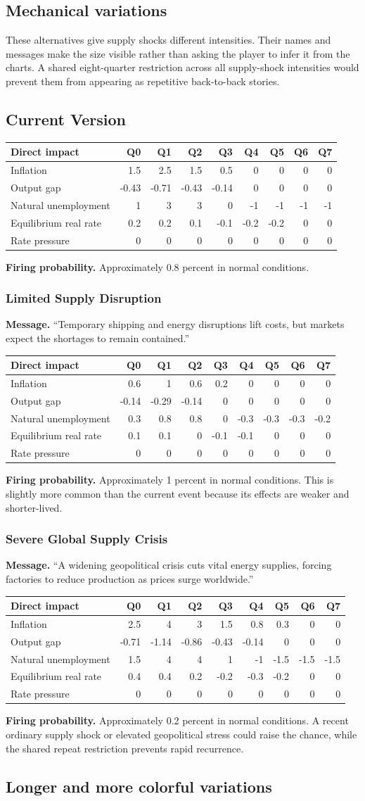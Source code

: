 \documentclass[11pt]{article}
\makeatletter
\newcommand{\prob}{\textbf{Firing probability.} }
\newcommand{\eventmessage}{\textbf{Message.} }
\newcommand{\impacttable}[5]{%
\begin{center}\small
\begin{tabular}{@{}l*{8}{r}@{}}
\toprule
Direct impact & Q0 & Q1 & Q2 & Q3 & Q4 & Q5 & Q6 & Q7\\
\midrule
Inflation & #1\\
Output gap & #2\\
Natural unemployment & #3\\
Equilibrium real rate & #4\\
Rate pressure & #5\\
\bottomrule
\end{tabular}
\end{center}}
\makeatother
\begin{document}
\subsection{Mechanical variations}

These alternatives give supply shocks different intensities.  Their names and
messages make the size visible rather than asking the player to infer it from the
charts.  A shared eight-quarter restriction across all supply-shock intensities
would prevent them from appearing as repetitive back-to-back stories.

\subsection{Current Version}

\impacttable{1.5&2.5&1.5&0.5&0&0&0&0}{-0.43&-0.71&-0.43&-0.14&0&0&0&0}{1&3&3&0&-1&-1&-1&-1}{0.2&0.2&0.1&-0.1&-0.2&-0.2&0&0}{0&0&0&0&0&0&0&0}
\prob Approximately 0.8 percent in normal conditions.

\subsubsection{Limited Supply Disruption}
\eventmessage ``Temporary shipping and energy disruptions lift costs, but markets expect the shortages to remain contained.''
\impacttable{0.6&1&0.6&0.2&0&0&0&0}{-0.14&-0.29&-0.14&0&0&0&0&0}{0.3&0.8&0.8&0&-0.3&-0.3&-0.3&-0.2}{0.1&0.1&0&-0.1&-0.1&0&0&0}{0&0&0&0&0&0&0&0}
\prob Approximately 1 percent in normal conditions.  This is slightly more common than the current event because its effects are weaker and shorter-lived.

\subsubsection{Severe Global Supply Crisis}
\eventmessage ``A widening geopolitical crisis cuts vital energy supplies, forcing factories to reduce production as prices surge worldwide.''
\impacttable{2.5&4&3&1.5&0.8&0.3&0&0}{-0.71&-1.14&-0.86&-0.43&-0.14&0&0&0}{1.5&4&4&1&-1&-1.5&-1.5&-1.5}{0.4&0.4&0.2&-0.2&-0.3&-0.2&0&0}{0&0&0&0&0&0&0&0}
\prob Approximately 0.2 percent in normal conditions.  A recent ordinary supply shock or elevated geopolitical stress could raise the chance, while the shared repeat restriction prevents rapid recurrence.

\subsection{Longer and more colorful variations}
\end{document}
